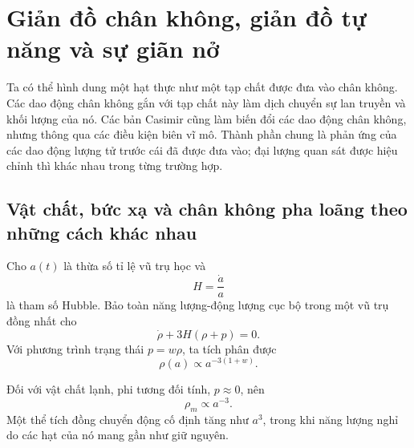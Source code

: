 \section{Giản đồ chân không, giản đồ tự năng và sự giãn nở}

\begin{classroomqa}
\end{classroomqa}

Ta có thể hình dung một hạt thực như một tạp chất được đưa vào chân không. Các dao động chân không gắn với tạp chất này làm dịch chuyển sự lan truyền và khối lượng của nó. Các bản Casimir cũng làm biến đổi các dao động chân không, nhưng thông qua các điều kiện biên vĩ mô. Thành phần chung là phản ứng của các dao động lượng tử trước cái đã được đưa vào; đại lượng quan sát được hiệu chỉnh thì khác nhau trong từng trường hợp.

\vspace{-2pt}
\subsection{Vật chất, bức xạ và chân không pha loãng theo những cách khác nhau}

Cho \(a(t)\) là thừa số tỉ lệ vũ trụ học và
\begin{equation}
H=\frac{\dot a}{a}
\end{equation}
là tham số Hubble. Bảo toàn năng lượng-động lượng cục bộ trong một vũ trụ đồng nhất cho
\begin{equation}
\dot\rho+3H(\rho+p)=0.
\end{equation}
Với phương trình trạng thái \(p=w\rho\), ta tích phân được
\begin{equation}
\rho(a)\propto a^{-3(1+w)}.
\end{equation}

Đối với vật chất lạnh, phi tương đối tính, \(p\approx0\), nên
\begin{equation}
\rho_m\propto a^{-3}.
\end{equation}
Một thể tích đồng chuyển động cố định tăng như \(a^3\), trong khi năng lượng nghỉ do các hạt của nó mang gần như giữ nguyên.

